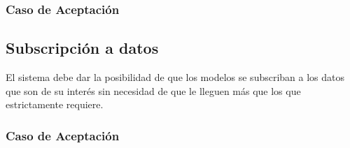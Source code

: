 \subsubsection*{Caso de Aceptación}

\linea 
\subsection*{Subscripción a datos}
El sistema debe dar la posibilidad de que los modelos se subscriban a los datos que son de su interés sin necesidad de que le lleguen más que los que estrictamente requiere.
\subsubsection*{Caso de Aceptación}


